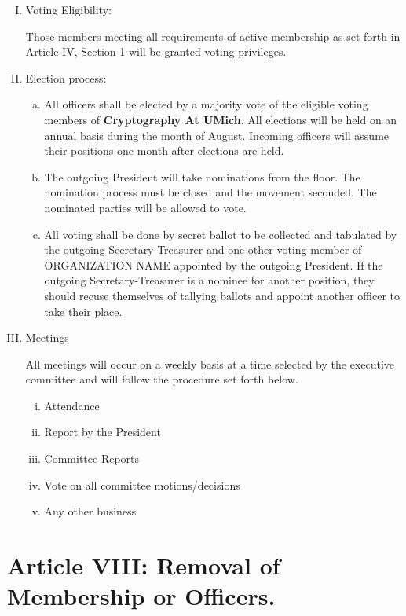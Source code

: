 \documentclass[11pt]{article}
\newcommand{\orgname}{\textbf{Cryptography At UMich}}
\begin{document}
    \begin{enumerate}[I.]
        \item Voting Eligibility:

        Those members meeting all requirements of active membership as set forth in Article IV, Section 1 will be granted voting privileges.

        \item Election process:
        \begin{enumerate}
            [a)]
            \item All officers shall be elected by a majority vote of the eligible voting members of \orgname.
            All elections will be held on an annual basis during the month of August.
            Incoming officers will assume their positions one month after elections are held.
            \item The outgoing President will take nominations from the floor.
            The nomination process must be closed and the movement seconded.
            The nominated parties will be allowed to vote.
            \item All voting shall be done by secret ballot to be collected and tabulated by the outgoing Secretary-Treasurer and one other voting member of ORGANIZATION NAME appointed by the outgoing President.
            If the outgoing Secretary-Treasurer is a nominee for another position, they should recuse themselves of tallying ballots and appoint another officer to take their place.
        \end{enumerate}
        \item Meetings

        All meetings will occur on a weekly basis at a time selected by the executive committee and will follow the procedure set forth below.

        \begin{enumerate}
            [i)]
            \item Attendance
            \item Report by the President
            \item Committee Reports
            \item Vote on all committee motions/decisions
            \item Any other business
        \end{enumerate}

    \end{enumerate}


    \section{Article VIII: Removal of Membership or Officers.}
\end{document}
